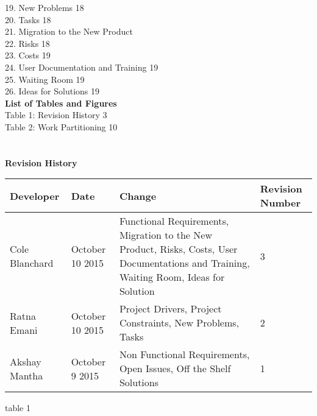 \documentclass[12pt]{article}
\begin{document}
19. New Problems \hfill \hfill 18\\
20. Tasks \hfill \hfill 18\\
21. Migration to the New Product \hfill \hfill \\
22. Risks \hfill \hfill 18\\
23. Costs \hfill \hfill 19\\
24. User Documentation and Training \hfill \hfill 19\\
25. Waiting Room \hfill \hfill 19\\
26. Ideas for Solutions \hfill \hfill 19\\
\textbf{List of Tables and Figures}\\
Table 1: Revision History \hfill \hfill 3\\
Table 2: Work Partitioning \hfill \hfill 10\\
\\\\
\textbf{Revision History}\\
\begin{center}
 \begin{tabular}{|C{3cm}|C{3cm}|C{3cm}|C{3cm}|}
 \hline
 \textbf{Developer} & \textbf{Date} & \textbf{Change} & \textbf{Revision Number}\\
 \hline \hline
 Cole Blanchard & October 10 2015 & Functional Requirements, Migration to the New Product, Risks, Costs, User Documentations and Training, Waiting Room, Ideas for Solution & 3\\
 \hline
 Ratna Emani & October 10 2015 & Project Drivers, Project Constraints, New Problems, Tasks & 2\\
 \hline
 Akshay Mantha & October 9 2015 & Non Functional Requirements, Open Issues, Off the Shelf Solutions & 1\\
 \hline
 \end{tabular}
 table 1
\end{center}

\pagebreak
\end{document}
